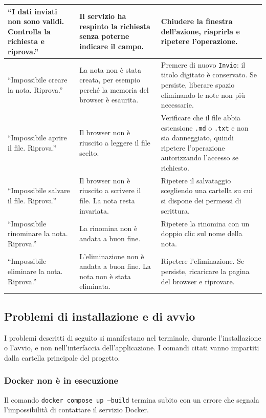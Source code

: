 \documentclass[a4paper, 10pt]{article}
\begin{document}
\begin{longtable}{|p{4.5cm}|p{4.3cm}|p{4.3cm}|}
    ``I dati inviati non sono validi. Controlla la richiesta e riprova.'' & Il servizio ha respinto la richiesta senza poterne indicare il campo. & Chiudere la finestra dell'azione, riaprirla e ripetere l'operazione. \\ \hline

    ``Impossibile creare la nota. Riprova.'' & La nota non è stata creata, per esempio perché la memoria del browser è esaurita. & Premere di nuovo \texttt{Invio}: il titolo digitato è conservato. Se persiste, liberare spazio eliminando le note non più necessarie. \\ \hline

    ``Impossibile aprire il file. Riprova.'' & Il browser non è riuscito a leggere il file scelto. & Verificare che il file abbia estensione \texttt{.md} o \texttt{.txt} e non sia danneggiato, quindi ripetere l'operazione autorizzando l'accesso se richiesto. \\ \hline

    ``Impossibile salvare il file. Riprova.'' & Il browser non è riuscito a scrivere il file. La nota resta invariata. & Ripetere il salvataggio scegliendo una cartella su cui si dispone dei permessi di scrittura. \\ \hline

    ``Impossibile rinominare la nota. Riprova.'' & La rinomina non è andata a buon fine. & Ripetere la rinomina con un doppio clic sul nome della nota. \\ \hline

    ``Impossibile eliminare la nota. Riprova.'' & L'eliminazione non è andata a buon fine. La nota non è stata eliminata. & Ripetere l'eliminazione. Se persiste, ricaricare la pagina del browser e riprovare. \\ \hline

\end{longtable}
\endgroup

\subsection{Problemi di installazione e di avvio}
\label{sec:problemi-installazione}
I problemi descritti di seguito si manifestano nel terminale, durante l'installazione o l'avvio, e non nell'interfaccia dell'applicazione. I comandi citati vanno impartiti dalla cartella principale del progetto.

\subsubsection{Docker non è in esecuzione}
Il comando \texttt{docker compose up --build} termina subito con un errore che segnala l'impossibilità di contattare il servizio Docker.
\end{document}
